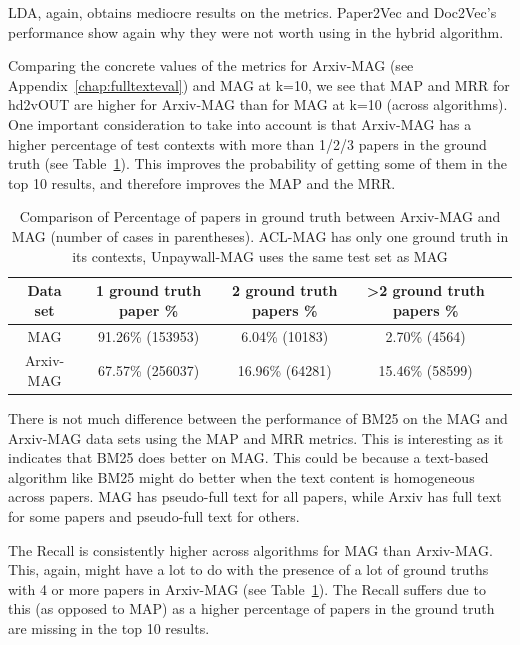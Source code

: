 LDA, again, obtains mediocre results on the metrics. Paper2Vec and Doc2Vec's performance show again why they were not worth using in the hybrid algorithm. 

Comparing the concrete values of the metrics for Arxiv-MAG (see Appendix~\ref{chap:fulltexteval}) and MAG at k=10, we see that MAP and MRR for hd2vOUT are higher for Arxiv-MAG than for MAG at k=10 (across algorithms). One important consideration to take into account is that Arxiv-MAG has a higher percentage of test contexts with more than 1/2/3 papers in the ground truth (see Table~\ref{tab:groundtruthscomparison}). This improves the probability of getting some of them in the top 10 results, and therefore improves the MAP and the MRR.
\begin{table}[]
    \centering
    \begin{tabular}{ccccc}
    \toprule
    Data set & 1 ground truth paper \% & 2 ground truth papers \% & >2 ground truth papers \% \\
    \midrule
        MAG & 91.26\% (153953) & 6.04\% (10183) & 2.70\% (4564) \\
        Arxiv-MAG & 67.57\% (256037) & 16.96\% (64281) & 15.46\% (58599)\\
    \bottomrule
    \end{tabular}
    \caption{Comparison of Percentage of papers in ground truth between Arxiv-MAG and MAG (number of cases in parentheses). ACL-MAG has only one ground truth in its contexts, Unpaywall-MAG uses the same test set as MAG}
    \label{tab:groundtruthscomparison}
\end{table}
There is not much difference between the performance of BM25 on the MAG and Arxiv-MAG data sets using the MAP and MRR metrics. This is interesting as it indicates that BM25 does better on MAG. This could be because a text-based algorithm like BM25 might do better when the text content is homogeneous across papers. MAG has pseudo-full text for all papers, while Arxiv has full text for some papers and pseudo-full text for others.

The Recall is consistently higher across algorithms for MAG than Arxiv-MAG. This, again, might have a lot to do with the presence of a lot of ground truths with 4 or more papers in Arxiv-MAG (see Table~\ref{tab:groundtruthscomparison}). The Recall suffers due to this (as opposed to MAP) as a higher percentage of papers in the ground truth are missing in the top 10 results. 

